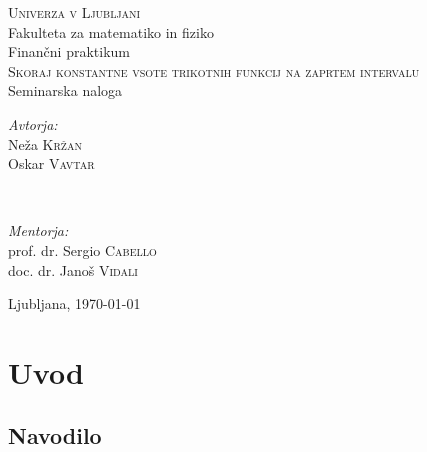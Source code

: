 \documentclass[11pt]{article}
\theoremstyle{definition}
\newcommand{\1}{\mathbbm{1}}
\begin{document}
\begin{titlepage} 

	\center 
	
	\textsc{\LARGE Univerza v Ljubljani}\\[0.5cm] 
	{\Large Fakulteta za matematiko in fiziko}\\[3cm] 
	
	{\large Finančni praktikum}\\[1.0cm]
	
	{\huge \textsc{Skoraj konstantne vsote trikotnih funkcij na zaprtem intervalu}}\\[1.0cm]
	
	{\large Seminarska naloga}\\[3.0cm]
	
	\begin{minipage}{0.4\textwidth}
		\begin{flushleft}
			\large
			\textit{Avtorja:}\\
			Neža \textsc{Kržan} \\
			Oskar \textsc{Vavtar} 
		\end{flushleft}
	\end{minipage}
	~
	\begin{minipage}{0.4\textwidth}
		\begin{flushright}
			\large
			\textit{Mentorja:}\\
			prof. dr. Sergio \textsc{Cabello} \\
			doc. dr. Janoš \textsc{Vidali}
		\end{flushright}
	\end{minipage}
	
	\vfill\vfill\vfill 
	
	{\large{Ljubljana, \today}} 
	 
	\vfill 
	
\end{titlepage}


\section{Uvod}
\vspace{0.5cm}


\subsection{Navodilo}
\vspace{0.5cm}
\end{document}
